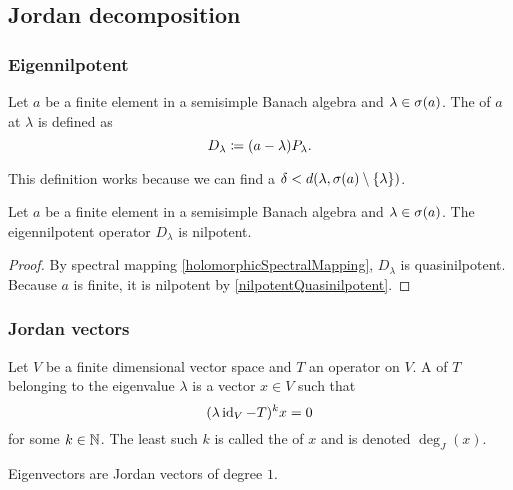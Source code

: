 \subsection{Jordan decomposition}
\subsubsection{Eigennilpotent}
\begin{definition}
Let $a$ be a finite element in a semisimple Banach algebra and $\lambda\in \sigma(a)$. The  of $a$ at $\lambda$ is defined as
\[ D_{\lambda} \coloneqq (a-\lambda)P_{\lambda}. \]
\end{definition}
This definition works because we can find a $\delta < d(\lambda, \sigma(a)\setminus\{\lambda\})$.

\begin{lemma}
Let $a$ be a finite element in a semisimple Banach algebra and $\lambda\in \sigma(a)$. The eigennilpotent operator $D_\lambda$ is nilpotent.
\end{lemma}
\begin{proof}
By spectral mapping \ref{holomorphicSpectralMapping}, $D_\lambda$ is quasinilpotent. Because $a$ is finite, it is nilpotent by \ref{nilpotentQuasinilpotent}.
\end{proof}



\subsubsection{Jordan vectors}
\begin{definition}
Let $V$ be a finite dimensional vector space and $T$ an operator on $V$. A  of $T$ belonging to the eigenvalue $\lambda$ is a vector $x\in V$ such that
\[ (\lambda\operatorname{id}_V - T)^kx = 0 \]
for some $k\in \mathbb{N}$. The least such $k$ is called the  of $x$ and is denoted $\deg_J(x)$.
\end{definition}
Eigenvectors are Jordan vectors of degree $1$.

